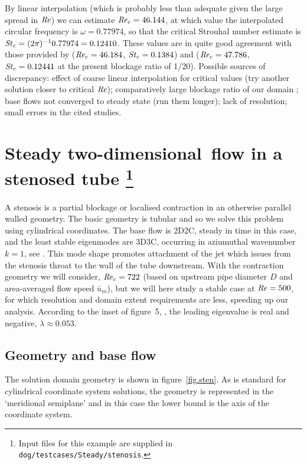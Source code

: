 \documentclass[11pt,a4paper]{report}
\newcommand\Rey{\mbox{\textit{Re}}}
\newcommand\Str{\mbox{\textit{St}}}
\newcommand\twod{two-di\-men\-sion\-al}
\begin{document}
By linear interpolation (which is probably less than adequate given
the large spread in $\Rey$) we can estimate $\Rey_c=46.144$, at which
value the interpolated circular frequency is $\omega=0.77974$, so that
the critical Strouhal number estimate is
$\Str_c=(2\pi)^{-1}0.77974=0.12410$.  These values are in quite good
agreement with those provided by \citet{jack87} ($\Rey_c=46.184$,
$\Str_c=0.1384$) and \citet{kumi06} ($\Rey_c=47.786$, $\Str_c=0.12441$
at the present blockage ratio of 1/20).  Possible sources of
discrepancy: effect of coarse linear interpolation for critical values
(try another solution closer to critical $\Rey$); comparatively large
blockage ratio of our domain \citep[see][regarding
  sensitivity]{kumi06}; base flows not converged to steady state (run
them longer); lack of resolution; small errors in the cited studies.

\section{Steady \twod\ flow in a stenosed tube
\protect\footnote{Input files for this example are supplied in
  \texttt{dog/testcases/Steady/stenosis}.}  }
\label{sec.sten3D}

A stenosis is a partial blockage or localised contraction in an
otherwise parallel walled geometry.  The basic geometry is tubular and
so we solve this problem using cylindrical coordinates.  The base flow
is 2D2C, steady in time in this case, and the least stable eigenmodes
are 3D3C, occurring in aziumuthal wavenumber $k=1$, see
\citet{shbl05}. This mode shape promotes attachment of the jet which
issues from the stenosis throat to the wall of the tube
downstream. With the contraction geometry we will consider,
$\Rey_c=722$ (based on upstream pipe diameter $D$ and area-averaged
flow speed $\bar{u}_m$), but we will here study a stable case at
$\Rey=500$, for which resolution and domain extent requirements are
less, speeding up our analysis.  According to the inset of figure~5,
\citet{shbl05}, the leading eigenvalue is real and negative,
$\lambda\approx0.053$.

\subsection{Geometry and base flow}

The solution domain geometry is shown in figure~\ref{fig.sten}.  As is
standard for cylindrical coordinate system solutions, the geometry is
represented in the `meridional semiplane' and in this case the lower
bound is the axis of the coordinate system.
\end{document}
